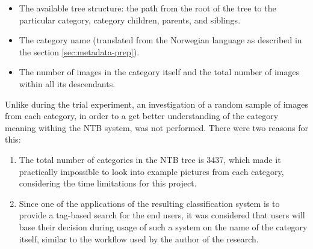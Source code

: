     \begin{itemize}
        \item The available tree structure: the path from the root of the tree to the particular category, category children, parents, and siblings.
        \item The category name (translated from the Norwegian language as described in the section \ref{sec:metadata-prep}).
        \item The number of images in the category itself and the total number of images within all its descendants.
    \end{itemize}
    
    
    Unlike during the trial experiment, an investigation of a random sample of images from each category, in order to a get better understanding of the category meaning withing the NTB system, was not performed. There were two reasons for this:
    
    \begin{enumerate}
        \item The total number of categories in the NTB tree is 3437, which made it practically impossible to look into example pictures from each category, considering the time limitations for this project. 
        \item Since one of the applications of the resulting classification system is to provide a tag-based search for the end users, it was considered that users will base their decision during usage of such a system on the name of the category itself, similar to the workflow used by the author of the research.
    \end{enumerate}
    
